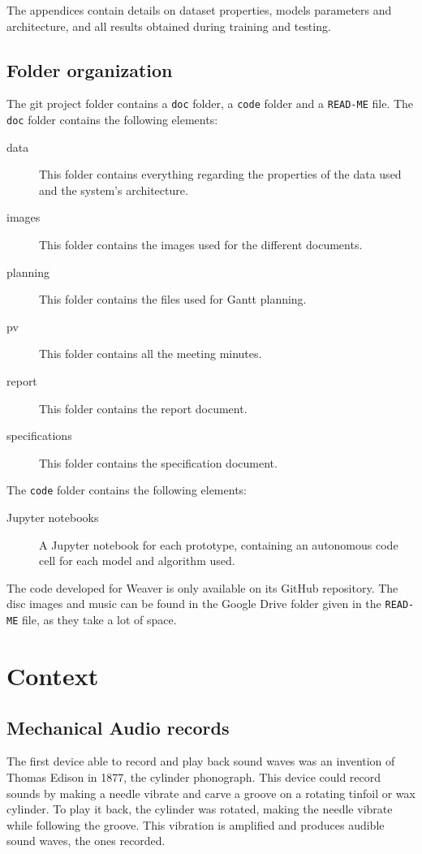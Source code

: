 \documentclass[12pt, twoside]{article}
\begin{document}
The appendices contain details on dataset properties, models parameters and architecture, and all results obtained during training and testing.
\subsection{Folder organization}
The git project folder contains a \texttt{doc} folder, a \texttt{code} folder and a \texttt{READ-ME} file. The \texttt{doc} folder contains the following elements:
\begin{description}
	\item[data] This folder contains everything regarding the properties of the data used and the system's architecture.
	\item[images] This folder contains the images used for the different documents.
	\item[planning] This folder contains the files used for Gantt planning.
	\item[pv] This folder contains all the meeting minutes.
	\item[report] This folder contains the report document.
	\item[specifications] This folder contains the specification document.
\end{description}
The \texttt{code} folder contains the following elements:
\begin{description}
	\item[Jupyter notebooks] A Jupyter notebook for each prototype, containing an autonomous code cell for each model and algorithm used. 
\end{description}
The code developed for Weaver is only available on its GitHub repository. The disc images and music can be found in the Google Drive folder given in the \texttt{READ-ME} file, as they take a lot of space.
\section{Context}
\subsection{Mechanical Audio records}
The first device able to record and play back sound waves was an invention of Thomas Edison in 1877, the cylinder phonograph\cite{audio}. This device could record sounds by making a needle vibrate and carve a groove on a rotating tinfoil or wax cylinder. To play it back, the cylinder was rotated, making the needle vibrate while following the groove. This vibration is amplified and produces audible sound waves, the ones recorded.
\end{document}
